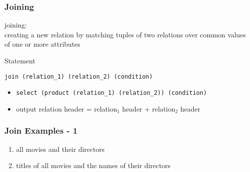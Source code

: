 \documentclass[dvipsnames]{beamer}
\theoremstyle{plain}
\begin{document}
\begin{frame}[fragile]
  \frametitle{Joining}

  \begin{definition}
    \alert{joining}:\\
      creating a new relation by matching tuples of two relations over common
      values of one or more attributes
  \end{definition}

  \pause
  \begin{block}{Statement}
    \begin{lstlisting}
join (relation_1) (relation_2) (condition)
    \end{lstlisting}
  \end{block}

  \pause
  \begin{itemize}
    \item \lstinline!select (product (relation_1) (relation_2)) (condition)!
    \item output relation header = relation$_1$ header + relation$_2$ header
  \end{itemize}
\end{frame}

\begin{frame}
  \frametitle{Join Examples - 1}

  \begin{example}
    \pause
    \begin{enumerate}
      \item all movies and their directors

      \pause
      \item titles of all movies and the names of their directors
    \end{enumerate}
  \end{example}
\end{frame}
\end{document}
